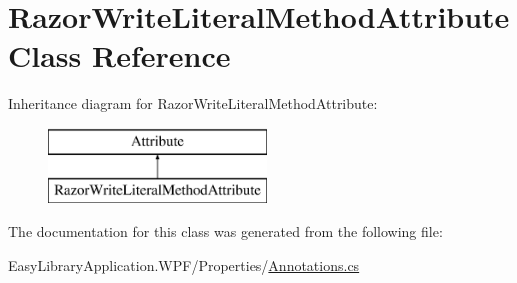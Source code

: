 \hypertarget{class_razor_write_literal_method_attribute}{}\section{Razor\+Write\+Literal\+Method\+Attribute Class Reference}
\label{class_razor_write_literal_method_attribute}
Inheritance diagram for Razor\+Write\+Literal\+Method\+Attribute\+:\begin{figure}[H]
\begin{center}
\leavevmode
\includegraphics[height=2.000000cm]{class_razor_write_literal_method_attribute}
\end{center}
\end{figure}


The documentation for this class was generated from the following file\+:\begin{DoxyCompactItemize}
\item 
Easy\+Library\+Application.\+W\+P\+F/\+Properties/\mbox{\hyperlink{_annotations_8cs}{Annotations.\+cs}}\end{DoxyCompactItemize}
